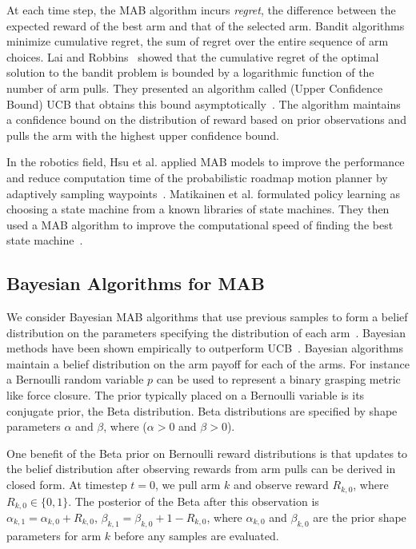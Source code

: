 \documentclass[10pt, conference]{ieeeconf}      %
\begin{document}
At each time step, the MAB algorithm incurs \textit{regret}, the difference between the expected reward of the best arm and that of the selected arm. Bandit algorithms minimize cumulative regret, the sum of regret over the entire sequence of arm choices.
Lai and Robbins~\cite{lai1985asymptotically} showed that the cumulative regret of the optimal solution to the bandit problem is bounded by a logarithmic function of the number of arm pulls.
They presented an algorithm called (Upper Confidence Bound) UCB that obtains this bound asymptotically~\cite{lai1985asymptotically}.
The algorithm maintains a confidence bound on the distribution of reward based on prior observations and pulls the arm with the highest upper confidence bound.

In the robotics field, Hsu et al. applied MAB models to improve the performance and reduce computation time of the probabilistic roadmap motion planner by adaptively sampling waypoints~\cite{hsu2005hybrid}. Matikainen et al. formulated policy learning as choosing a state machine from a known libraries of state machines. They then used a MAB algorithm to improve the computational speed of finding the best state machine~\cite{matikainen2013multi}. 




\subsection{Bayesian Algorithms for MAB}\label{sec:bandit_algorithm}
We consider Bayesian MAB algorithms that use previous samples to form a belief distribution on the parameters specifying the distribution of each arm~\cite{agrawal2011analysis,weber1992gittins}.  Bayesian methods have been shown empirically to outperform UCB~\cite{chapelle2011empirical, bachman2013greedy}. Bayesian algorithms maintain a belief distribution on the arm payoff for each of the arms. For instance a Bernoulli random variable $p$ can be used to represent a binary grasping metric like force closure. The prior typically placed on a Bernoulli variable is its conjugate prior, the Beta distribution.
Beta distributions are specified by shape parameters $\alpha$ and $\beta$, where ($\alpha >0$ and $\beta >0$).


One benefit of the Beta prior on Bernoulli reward distributions is that updates to the belief distribution after observing rewards from arm pulls can be derived in closed form.
At timestep $t=0$, we pull arm $k$ and observe reward $R_{k,0}$, where $R_{k,0} \in \lbrace 0, 1\rbrace$.
The posterior of the Beta after this observation is $\alpha_{k, 1} = \alpha_{k, 0} + R_{k,0}$,  $\beta_{k, 1} = \beta_{k, 0} + 1-R_{k,0}$, where $\alpha_{k,0}$ and $\beta_{k,0}$ are the prior shape parameters for arm $k$ before any samples are evaluated.
\end{document}
